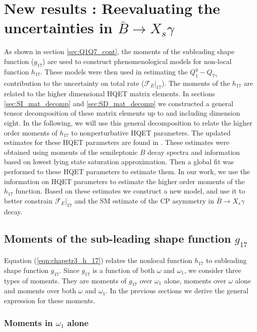 \chapter{New results : Reevaluating the uncertainties in $\bar{B}\rightarrow X_s\gamma$}\label{reevaluating_b_to_x}

As shown in section \ref{sec:Q1Q7_cont}, the moments of the subleading shape function ($g_{17}$) are used to construct phenomenological models for non-local function $h_{17}$. These models were then used in estimating the $Q_{1}^q-Q_{7\gamma}$ contribution to the uncertainty on total rate ($\mathcal{F}_E|_{17}$). The moments of the $h_{17}$ are related to the higher dimensional HQET matrix elements. In sections \ref{sec:SI_mat_decomp} and \ref{sec:SD_mat_decomp} we constructed a general tensor decomposition of these matrix elements up to and including dimension eight. In the following, we will use this general decomposition to relate the higher order moments of $h_{17}$ to nonperturbative HQET parameters. The updated estimates for these HQET parameters are found in \cite{Gambino:2016jkc}. These estimates were obtained using moments of the semileptonic $B$ decay spectra and information based on lowest lying state saturation approximation. Then a global fit was performed to these HQET parameters to estimate them. In our work, we use the information on HQET parameters to estimate the higher order moments of the $h_{17}$ function. Based on these estimates we construct a new model, and use it to better constrain $\mathcal{F}_E|_{17}$ and the SM estimate of the CP asymmetry in $\bar{B}\to X_s\gamma$ decay. 

\section{Moments of the sub-leading shape function $g_{17}$}\label{sec:chap5_moments_g_17}

Equation (\ref{eqn:chapetr3_h_17}) relates the nonlocal function $h_{17}$ to subleading shape function $g_{17}$. Since $g_{17}$ is a function of both $\omega$ and $\omega_1$, we consider three types of moments. They are moments of $g_{17}$ over $\omega_1$ alone, moments over $\omega$ alone and moments over both $\omega$ and $\omega_1$. In the previous sections we derive the general expression for these moments.

\subsection{Moments in $\omega_1$ alone}

